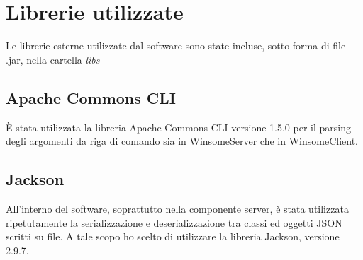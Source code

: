 \section{Librerie utilizzate}
Le librerie esterne utilizzate dal software sono state incluse, sotto forma di file .jar, nella
cartella \textit{libs}

\subsection{Apache Commons CLI}
È stata utilizzata la libreria Apache Commons CLI versione 1.5.0 per il parsing degli argomenti da riga 
di comando sia in WinsomeServer che in WinsomeClient.
\subsection{Jackson}
All'interno del software, soprattutto nella componente server, è stata utilizzata ripetutamente
la serializzazione e deserializzazione tra classi ed oggetti JSON scritti su file.
A tale scopo ho scelto di utilizzare la libreria Jackson, versione 2.9.7.